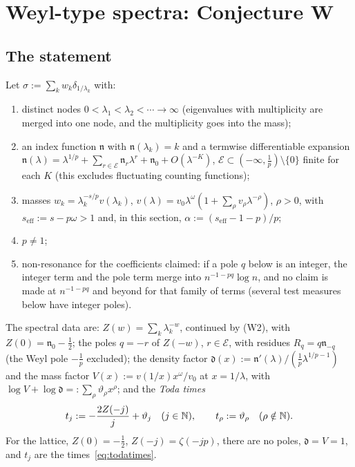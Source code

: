 \section{Weyl-type spectra: Conjecture W}\label{sec:weyl}

\subsection{The statement}\label{sec:conj-W}
Let $\sigma:=\sum_kw_k\delta_{1/\lambda_k}$ with:
\begin{enumerate}
\item[(W1)] distinct nodes $0<\lambda_1<\lambda_2<\dotsb\to\infty$ (eigenvalues with multiplicity are merged into one node, and the multiplicity
goes into the mass);
\item[(W2)] an index function $\mathfrak n$ with $\mathfrak n(\lambda_k)=k$ and a termwise differentiable expansion
$\mathfrak n(\lambda)=\lambda^{1/p}+\sum_{r\in\mathcal E}\mathfrak n_r\lambda^r+\mathfrak n_0+O(\lambda^{-K})$, $\mathcal E\subset(-\infty,\frac1p)\setminus\{0\}$ finite for
each $K$ (this excludes fluctuating counting functions);
\item[(W3)] masses $w_k=\lambda_k^{-s/p}v(\lambda_k)$, $v(\lambda)=v_0\lambda^\omega(1+\sum_\rho v_\rho\lambda^{-\rho})$, $\rho>0$, with
$s_{\mathrm{eff}}:=s-p\omega>1$ and, in this section, $\alpha:=(s_{\mathrm{eff}}-1-p)/p$;
\item[(W4)] $p\ne1$;
\item[(W5)] non-resonance for the coefficients claimed: if a pole $q$ below is an integer, the integer term and the pole term
merge into $n^{-1-pq}\log n$, and no claim is made at $n^{-1-pq}$ and beyond for that family of terms (several test measures below have
integer poles).
\end{enumerate}
The spectral data are: $Z(w)=\sum_k\lambda_k^{-w}$, continued by (W2), with $Z(0)=\mathfrak n_0-\frac12$; the poles $q=-r$ of $Z(-w)$, $r\in\mathcal E$,
with residues $R_q=q\mathfrak n_{-q}$ (the Weyl pole $-\frac1p$ excluded); the density factor $\mathfrak d(x):=\mathfrak n'(\lambda)/(\frac1p\lambda^{1/p-1})$ and the
mass factor $V(x):=v(1/x)x^\omega/v_0$ at $x=1/\lambda$, with $\log V+\log\mathfrak d=:\sum_\rho\vartheta_\rho x^\rho$; and the \emph{Toda times}
\[
  t_j:=-\frac{2Z(-j)}j+\vartheta_j\quad(j\in\mathbb{N}),\qquad t_\rho:=\vartheta_\rho\quad(\rho\notin\mathbb{N}).
\]
For the lattice, $Z(0)=-\frac12$, $Z(-j)=\zeta(-jp)$, there are no poles, $\mathfrak d=V=1$, and $t_j$ are the times~\eqref{eq:todatimes}.

